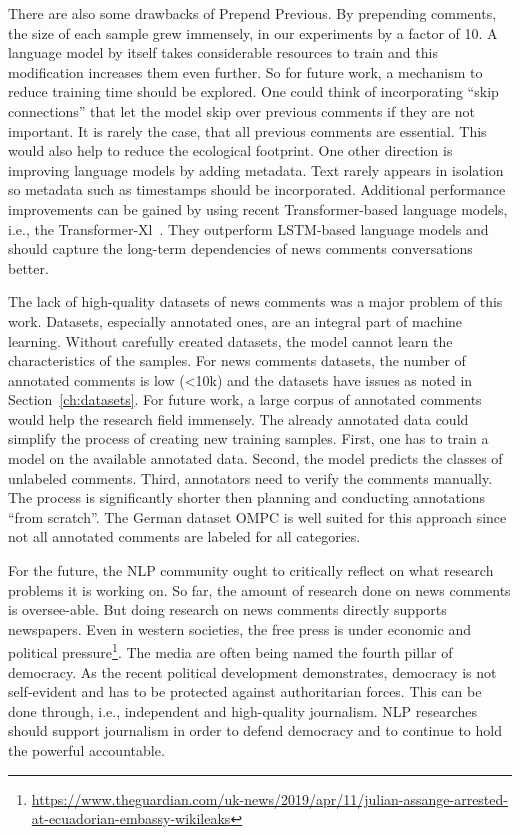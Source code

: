 There are also some drawbacks of Prepend Previous.
By prepending comments, the size of each sample grew immensely, in our experiments by a factor of 10.
A language model by itself takes considerable resources to train and  this modification increases them even further.
So for future work, a mechanism to reduce training time should be explored.
One could think of incorporating ``skip connections'' that let the model skip over previous comments if they are not important.
It is rarely the case, that all previous comments are essential.
This would also help to reduce the ecological footprint.
One other direction is improving language models by adding metadata.
Text rarely appears in isolation so metadata such as timestamps should be incorporated.
Additional performance improvements can be gained by using recent Transformer-based language models, i.e., the Transformer-Xl~\cite{DBLP:journals/corr/abs-1901-02860}.
They outperform LSTM-based language models and should capture the long-term dependencies of news comments conversations better.


The lack of high-quality datasets of news comments was a major problem of this work.
Datasets, especially annotated ones, are an integral part of machine learning.
Without carefully created datasets, the model cannot learn the characteristics of the samples.
For news comments datasets, the number of annotated comments is low (<10k) and the datasets have issues as noted in Section~\ref{ch:datasets}.
For future work, a large corpus of annotated comments would help the research field immensely.
The already annotated data could simplify the process of creating new training samples.
First, one has to train a model on the available annotated data.
Second, the model predicts the classes of unlabeled comments.
Third, annotators need to verify the comments manually.
The process is significantly shorter then planning and conducting annotations ``from scratch''.
The German dataset OMPC is well suited for this approach since not all annotated comments are labeled for all categories.

For the future, the NLP community ought to critically reflect on what research problems it is working on.
So far, the amount of research done on news comments is oversee-able.
But doing research on news comments directly supports newspapers.
Even in western societies, the free press is under economic and political pressure\footnote{\url{https://www.theguardian.com/uk-news/2019/apr/11/julian-assange-arrested-at-ecuadorian-embassy-wikileaks}}.
The media are often being named the fourth pillar of democracy.
As the recent political development demonstrates, democracy is not self-evident and has to be protected against authoritarian forces.
This can be done through, i.e., independent and high-quality journalism.
NLP researches should support journalism in order to defend democracy and to continue to hold the powerful accountable.

